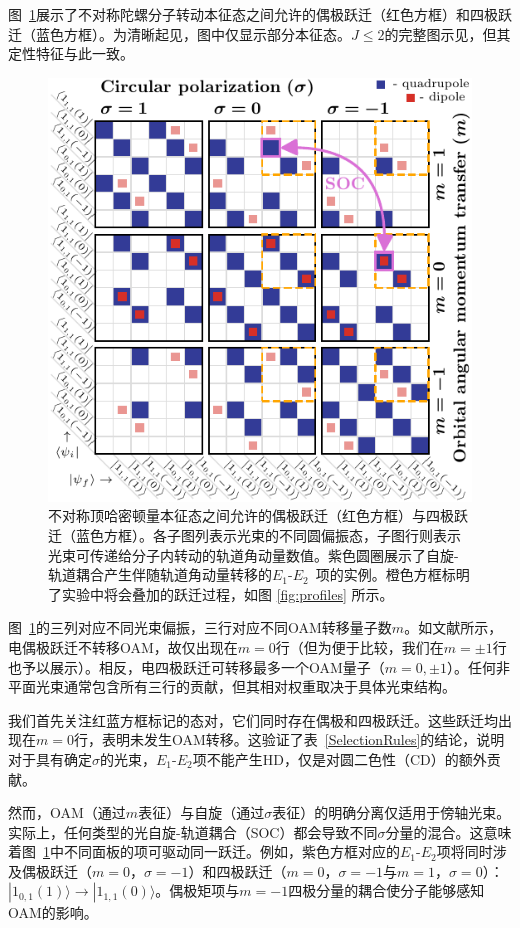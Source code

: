\documentclass[reprint,aps,prl,twocolumn,superscriptaddress,groupedaddress]{revtex4-2}
\newcommand{\eoet}{$E_1$-$E_2$}
\begin{document}
图~\ref{fig:gridJ1}展示了不对称陀螺分子转动本征态之间允许的偶极跃迁（红色方框）和四极跃迁（蓝色方框）。为清晰起见，图中仅显示部分本征态。$J\leq 2$的完整图示见\cite{Note1}，但其定性特征与此一致。
\begin{figure}[ht!]
    \centering
    \includegraphics[width=\linewidth]{Figure1.pdf}
    \caption{不对称顶哈密顿量本征态之间允许的偶极跃迁（红色方框）与四极跃迁（蓝色方框）。各子图列表示光束的不同圆偏振态，子图行则表示光束可传递给分子内转动的轨道角动量数值。紫色圆圈展示了自旋-轨道耦合产生伴随轨道角动量转移的\eoet ~项的实例。橙色方框标明了实验中将会叠加的跃迁过程，如图 \ref{fig:profiles} 所示。}
    \label{fig:gridJ1}
\end{figure}
图~\ref{fig:gridJ1}的三列对应不同光束偏振，三行对应不同OAM转移量子数$m$。如文献\cite{Maslov2024,Maslov_Thesis}所示，电偶极跃迁不转移OAM，故仅出现在$m=0$行（但为便于比较，我们在$m=\pm 1$行也予以展示）。相反，电四极跃迁可转移最多一个OAM量子（$m=0,\pm 1$）。任何非平面光束通常包含所有三行的贡献，但其相对权重取决于具体光束结构。

我们首先关注红蓝方框标记的态对，它们同时存在偶极和四极跃迁。这些跃迁均出现在$m=0$行，表明未发生OAM转移。这验证了表~\ref{SelectionRules}的结论，说明对于具有确定$\sigma$的光束，\eoet 项不能产生HD，仅是对圆二色性（CD）的额外贡献。

然而，OAM（通过$m$表征）与自旋（通过$\sigma$表征）的明确分离仅适用于傍轴光束。实际上，任何类型的光自旋-轨道耦合（SOC）都会导致不同$\sigma$分量的混合\cite{Bliokh2015,Bliokh2023}。这意味着图~\ref{fig:gridJ1}中不同面板的项可驱动同一跃迁。例如，紫色方框对应的\eoet 项将同时涉及偶极跃迁（$m=0$，$\sigma=-1$）和四极跃迁（$m=0$，$\sigma=-1$与$m=1$，$\sigma=0$）：$| 1_{0,1}(1) \rangle \to | 1_{1,1}(0) \rangle$。偶极矩项与$m=-1$四极分量的耦合使分子能够感知OAM的影响。
\end{document}

